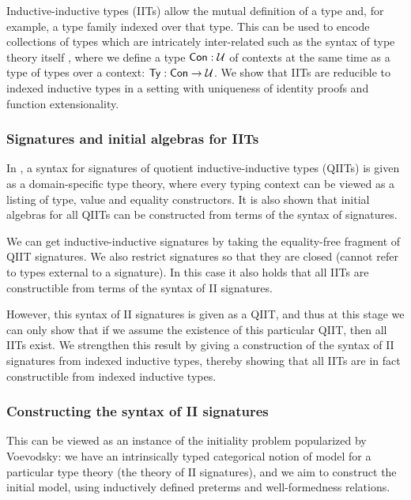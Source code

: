 

Inductive-inductive types \cite{nordvallinductive, gabephd} (IITs) allow the
mutual definition of a type and, for example, a type family indexed over that
type.  This can be used to encode collections of types which are intricately
inter-related such as the syntax of type theory itself \cite{ttintt}, where we
define a type $\mathsf{Con} : \mathcal{U}$ of contexts at the same time as a type of types over
a context: $\mathsf{Ty} : \mathsf{Con} \to \mathcal{U}$. We show that IITs are reducible to indexed
inductive types in a setting with uniqueness of identity proofs and function
extensionality.

\subsubsection*{Signatures and initial algebras for IITs}

In \cite{qiit}, a syntax for signatures of quotient inductive-inductive types
(QIITs) is given as a domain-specific type theory, where every typing
context can be viewed as a listing of type, value and equality constructors. It
is also shown that initial algebras for all QIITs can be constructed from terms
of the syntax of signatures.

We can get inductive-inductive signatures by taking the equality-free fragment
of QIIT signatures. We also restrict signatures so that they are closed (cannot
refer to types external to a signature). In this case it also holds that all
IITs are constructible from terms of the syntax of II signatures.

However, this syntax of II signatures is given as a QIIT, and thus at this stage
we can only show that if we assume the existence of this particular QIIT, then
all IITs exist. We strengthen this result by giving a construction of the syntax
of II signatures from indexed inductive types, thereby showing that all IITs are
in fact constructible from indexed inductive types.

\subsubsection*{Constructing the syntax of II signatures}

This can be viewed as an instance of the initiality problem popularized by
Voevodsky: we have an intrinsically typed categorical notion of model for a
particular type theory (the theory of II signatures), and we aim to construct
the initial model, using inductively defined preterms and well-formedness
relations.

